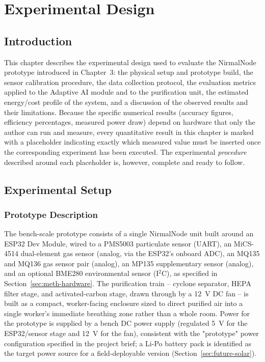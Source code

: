 \chapter{Experimental Design}
\label{ch:experimental}

\section{Introduction}
\label{sec:exp-intro}

This chapter describes the experimental design used to evaluate the NirmalNode prototype introduced in Chapter~3: the physical setup and prototype build, the sensor calibration procedure, the data collection protocol, the evaluation metrics applied to the Adaptive AI module and to the purification unit, the estimated energy/cost profile of the system, and a discussion of the observed results and their limitations. Because the specific numerical results (accuracy figures, efficiency percentages, measured power draw) depend on hardware that only the author can run and measure, every quantitative result in this chapter is marked with a \TODO{} placeholder indicating exactly which measured value must be inserted once the corresponding experiment has been executed. The experimental \emph{procedure} described around each placeholder is, however, complete and ready to follow.

\section{Experimental Setup}
\label{sec:exp-setup}

\subsection{Prototype Description}
\label{sec:exp-prototype}

The bench-scale prototype consists of a single NirmalNode unit built around an ESP32 Dev Module, wired to a PMS5003 particulate sensor (UART), an MiCS-4514 dual-element gas sensor (analog, via the ESP32's onboard ADC), an MQ135 and MQ136 gas sensor pair (analog), an MP135 supplementary sensor (analog), and an optional BME280 environmental sensor (I$^2$C), as specified in Section~\ref{sec:meth-hardware}. The purification train -- cyclone separator, HEPA filter stage, and activated-carbon stage, drawn through by a 12~V DC fan -- is built as a compact, worker-facing enclosure sized to direct purified air into a single worker's immediate breathing zone rather than a whole room. Power for the prototype is supplied by a bench DC power supply (regulated 5~V for the ESP32/sensor stage and 12~V for the fan), consistent with the "prototype" power configuration specified in the project brief; a Li-Po battery pack is identified as the target power source for a field-deployable version (Section~\ref{sec:future-solar}).

